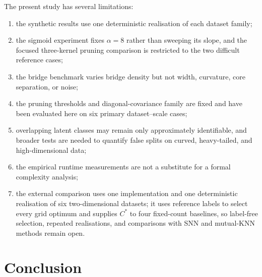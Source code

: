 \documentclass[pdflatex,sn-mathphys-num]{sn-jnl}
\begin{document}
The present study has several limitations:
\begin{enumerate}
    \item the synthetic results use one deterministic realisation of each dataset family;
    \item the sigmoid experiment fixes $\alpha=8$ rather than sweeping its slope, and the focused three-kernel pruning comparison is restricted to the two difficult reference cases;
    \item the bridge benchmark varies bridge density but not width, curvature, core separation, or noise;
    \item the pruning thresholds and diagonal-covariance family are fixed and have been evaluated here on six primary dataset--scale cases;
    \item overlapping latent classes may remain only approximately identifiable, and broader tests are needed to quantify false splits on curved, heavy-tailed, and high-dimensional data;
    \item the empirical runtime measurements are not a substitute for a formal complexity analysis;
    \item the external comparison uses one implementation and one deterministic realisation of six two-dimensional datasets; it uses reference labels to select every grid optimum and supplies $C^*$ to four fixed-count baselines, so label-free selection, repeated realisations, and comparisons with SNN and mutual-KNN methods remain open.
\end{enumerate}

\section{Conclusion}\label{sec:conclusion}
\end{document}
